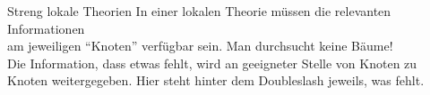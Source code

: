 \begin{frame}
  {Streng lokale Theorien}
  \onslide<+->
  \onslide<+->
  In einer lokalen Theorie müssen die relevanten Informationen\\
  \alert{am jeweiligen "`Knoten"' verfügbar sein}. Man durchsucht keine Bäume!\\
  \onslide<+->
  \Viertelzeile
  Die Information, dass etwas fehlt, wird an geeigneter Stelle \alert{von Knoten zu Knoten weitergegeben}. Hier steht hinter dem \alert{Doubleslash} jeweils, was fehlt.\\
  \centering 
  \onslide<+->
  \Halbzeile
  \centering
    \onslide<+->\hspace{3em}
\end{frame}

